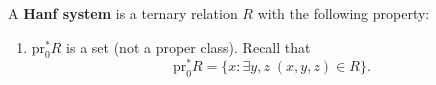 A \textbf{Hanf system} is a ternary relation $R$ with the following property:

\begin{enumerate}
\item[(i)] $\mathrm{pr}_0^* R$ is a set (not a proper class). Recall that
$$\mathrm{pr}_0^* R = \{x : \exists y, z\; (x, y, z) \in R\}.$$
\end{enumerate}
